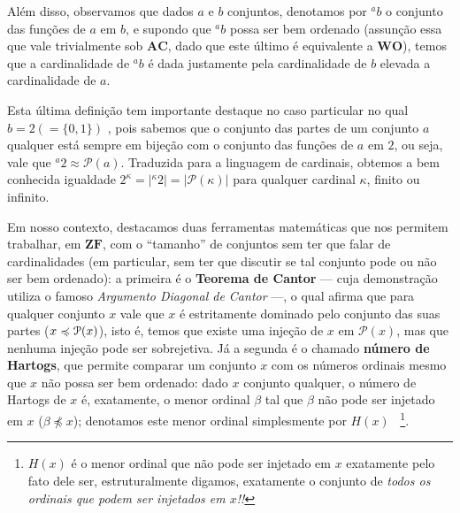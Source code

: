 \documentclass{hipatia}
\newcommand{\partes}[1]{\mathcal{P}(#1)}
\newcommand{\nback}[1][-.95pt]{
  \mathrel{\raisebox{#1}{$\rotatebox[origin=c]{-315}{\scaleobj{0.55}{-}}$}}
}
\newcommand{\preccurlyneq}{%
\mathrel{\ooalign{$\preccurlyeq$\cr\kern1.2pt$\nback$}}}
\newcommand{\wo}{\mathbf{WO}}
\newcommand{\ac}{\mathbf{AC}}
\newcommand{\zf}{\mathbf{ZF}}
\begin{document}
Além disso, observamos que dados $a$ e $b$ conjuntos,
denotamos por $^ab$ o conjunto das funções de $a$ em $b$, e
supondo que $^a b$ possa ser bem ordenado (assunção essa que
vale trivialmente sob $\ac$, dado que este último é
equivalente a $\wo$), temos que a cardinalidade de $^ab$ é
dada justamente pela cardinalidade de $b$ elevada a
cardinalidade de $a$.

Esta última definição tem importante destaque no caso
particular no qual     $b=2 (=\{0,1\})$
, pois sabemos que o conjunto
das partes de um conjunto $a$ qualquer está sempre em bijeção com o
conjunto das funções de $a$ em $2$, ou seja, vale que
$^a2\approx\partes{a}$. Traduzida para a linguagem de
cardinais, obtemos a bem conhecida igualdade $2^\kappa =
|^\kappa 2| = |\partes{\kappa}|$ para qualquer cardinal
$\kappa$, finito ou infinito. 

\sepdecorada


Em nosso contexto, destacamos duas ferramentas matemáticas que
nos permitem trabalhar, em $\zf$, com o ``tamanho'' de
conjuntos sem ter que falar de cardinalidades (em particular, sem
ter que discutir se tal conjunto pode ou não ser bem
ordenado): a primeira é o \textbf{Teorema de Cantor} ---
cuja demonstração utiliza o famoso {\it Argumento Diagonal
de Cantor} ---, o qual afirma que para qualquer conjunto $x$
vale que $x$ é estritamente dominado pelo conjunto das suas
partes ($x\preccurlyneq\partes{x}$), isto é, temos que
existe uma injeção de $x$ em $\partes{x}$, mas que nenhuma
injeção pode ser sobrejetiva. Já a segunda é o chamado
\textbf{número de Hartogs}, que permite comparar um conjunto
$x$ com os números ordinais mesmo que $x$ não possa ser bem
ordenado: dado $x$ conjunto qualquer,  o número de Hartogs
de $x$ é, exatamente, o menor ordinal $\beta$ tal que
$\beta$ não pode ser injetado em $x$ ($\beta\npreccurlyeq
x$); denotamos este menor ordinal simplesmente por
$H(x)$ ~\footnote{$H(x)$ é o menor ordinal que não pode ser
injetado em $x$ exatamente pelo fato dele ser,
estruturalmente digamos, exatamente o conjunto de {\it todos
os ordinais que podem ser injetados em $x$!!}}.
\end{document}
